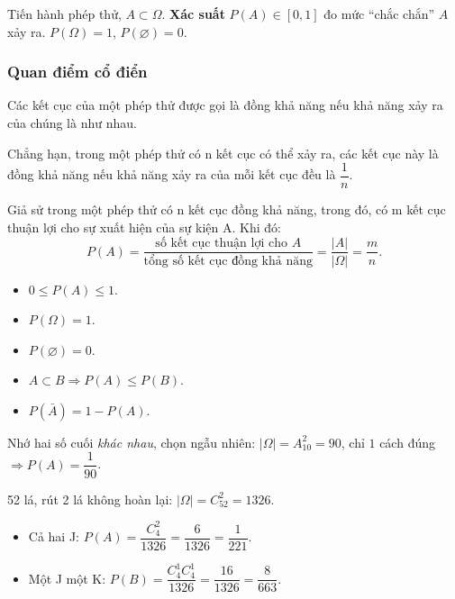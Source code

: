 \documentclass[12pt,a4paper]{article}
\begin{document}
\begin{dinhnghia}[title={Khái niệm xác suất}]
Tiến hành phép thử, $A \subset \Omega$. \textbf{Xác suất} $P(A) \in [0,1]$ đo mức ``chắc chắn'' $A$ xảy ra. $P(\Omega) = 1$, $P(\varnothing) = 0$.
\end{dinhnghia}

\subsubsection{Quan điểm cổ điển}
\begin{dinhnghia}[title=Kết cục đồng khả năng]
Các kết cục của một phép thử được gọi là đồng khả năng nếu khả năng xảy ra của chúng là như nhau.

Chẳng hạn, trong một phép thử có n kết cục có thể xảy ra, các kết cục này là đồng khả năng nếu khả năng xảy ra của mỗi kết cục đều là $\dfrac{1}{n}$.
\end{dinhnghia}

\begin{dinhnghia}
  Giả sử trong một phép thử có n kết cục đồng khả năng, trong đó, có m kết cục thuận lợi cho sự xuất hiện của sự kiện A. Khi đó:
  \[
    P(A) = \dfrac{\text{số kết cục thuận lợi cho } A}{\text{tổng số kết cục đồng khả năng}}
    = \dfrac{|A|}{|\Omega|} = \dfrac{m}{n}.
  \]
\end{dinhnghia}

\begin{tinhchat}[title={Tính chất của xác suất}]
\begin{itemize}
  \item $0 \le P(A) \le 1$.
  \item $P(\Omega) = 1$.
  \item $P(\varnothing) = 0$.
  \item $A \subset B \Rightarrow P(A) \le P(B)$.
  \item $P(\bar{A}) = 1 - P(A)$.
\end{itemize}
\end{tinhchat}

\begin{vidu}[title={Gọi điện quên 2 số cuối}]
Nhớ hai số cuối \emph{khác nhau}, chọn ngẫu nhiên: $|\Omega| = A_{10}^2 = 90$, chỉ $1$ cách đúng $\Rightarrow P(A) = \dfrac{1}{90}$.
\end{vidu}

\begin{vidu}[title={Rút 2 lá bài}]
52 lá, rút 2 lá không hoàn lại: $|\Omega| = C_{52}^2 = 1326$.
\begin{itemize}
  \item Cả hai J: $P(A) = \dfrac{C_4^2}{1326} = \dfrac{6}{1326} = \dfrac{1}{221}$.
  \item Một J một K: $P(B) = \dfrac{C_4^1 C_4^1}{1326} = \dfrac{16}{1326} = \dfrac{8}{663}$.
\end{itemize}
\end{vidu}
\end{document}

